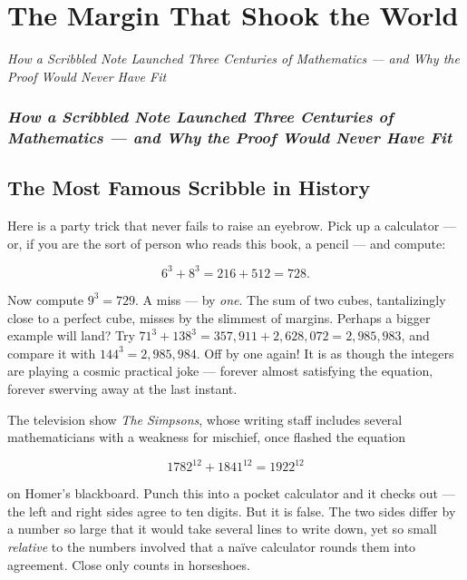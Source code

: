 \documentclass[11pt,twoside,openright]{book}
\theoremstyle{definition}
\theoremstyle{remark}
\begin{document}
\chapter[The Margin That Shook the World]{The Margin That Shook the World}
\vspace{-0.5em}
\begin{center}\textit{How a Scribbled Note Launched Three Centuries of Mathematics --- and Why the Proof Would Never Have Fit}\end{center}
\vspace{1em}


\subsection{\textit{How a Scribbled Note Launched Three Centuries of Mathematics --- and Why the Proof Would Never Have Fit}}


\section{The Most Famous Scribble in History}

Here is a party trick that never fails to raise an eyebrow. Pick up a calculator --- or, if you are the sort of person who reads this book, a pencil --- and compute:

\[6^3 + 8^3 = 216 + 512 = 728.\]

Now compute $9^3 = 729$. A miss --- by \textit{one}. The sum of two cubes, tantalizingly close to a perfect cube, misses by the slimmest of margins. Perhaps a bigger example will land? Try $71^3 + 138^3 = 357{,}911 + 2{,}628{,}072 = 2{,}985{,}983$, and compare it with $144^3 = 2{,}985{,}984$. Off by one again! It is as though the integers are playing a cosmic practical joke --- forever almost satisfying the equation, forever swerving away at the last instant.

The television show \textit{The Simpsons}, whose writing staff includes several mathematicians with a weakness for mischief, once flashed the equation

\[1782^{12} + 1841^{12} = 1922^{12}\]

on Homer's blackboard. Punch this into a pocket calculator and it checks out --- the left and right sides agree to ten digits. But it is false. The two sides differ by a number so large that it would take several lines to write down, yet so small \textit{relative} to the numbers involved that a na\"ive calculator rounds them into agreement. Close only counts in horseshoes.
\end{document}

